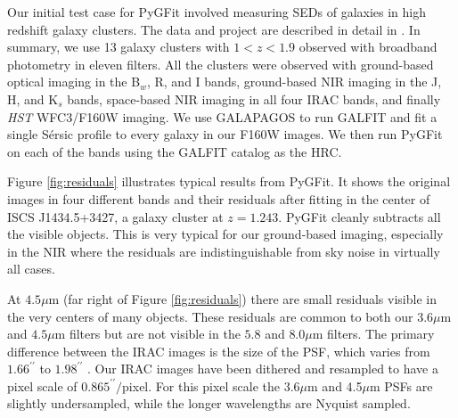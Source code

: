 \documentclass[apj]{emulateapj}
\newcommand{\sersic}{S\'{e}rsic}
\newcommand{\galfit}{GALFIT}
\newcommand{\pygfit}{PyGFit}
\newcommand{\galapagos}{GALAPAGOS}
\begin{document}
\begin{figure*}
\caption{Three examples of cases where \pygfit{} can fail.  The top row of panels shows the F160W images used to create the HRC.  The center row of panels shows the LRI with the same field of view, while the bottom row of panels shows the residuals of the LRI after fitting.  The LRI for the left uses ground-based R band imaging, while the example in the center is taken from the $4.5\mu$m imaging and the example on the right is taken from the IRAC $3.6\mu$m imaging.  The left column shows a galaxy with extended features which cannot be described by a \sersic{} profile.  The center column shows a galaxy which is isolated in F160W but which is blended with another source in $4.5\mu$m.  The right column shows a galaxy near the edge of the F160W image which is blended with a bright source which is outside of the F160W image.  Further details are in the text.}\label{fig:problems}
\end{figure*}

Our initial test case for \pygfit{} involved measuring SEDs of galaxies in high redshift galaxy clusters.  The data and project are described in detail in \citet{mancone13}.  In summary, we use 13 galaxy clusters with $1 < z < 1.9$ observed with broadband photometry in eleven filters.  All the clusters were observed with ground-based optical imaging in the B$_w$, R, and I bands, ground-based NIR imaging in the J, H, and K$_s$ bands, space-based NIR imaging in all four IRAC bands, and finally {\itshape HST} WFC3/F160W imaging.  We use \galapagos{} \citep{galapagos} to run \galfit{} and fit a single \sersic{} profile to every galaxy in our F160W images.  We then run \pygfit{} on each of the bands using the \galfit{} catalog as the HRC.

Figure \ref{fig:residuals} illustrates typical results from \pygfit{}.  It shows the original images in four different bands and their residuals after fitting in the center of ISCS J1434.5+3427, a galaxy cluster at $z=1.243$.  \pygfit{} cleanly subtracts all the visible objects.  This is very typical for our ground-based imaging, especially in the NIR where the residuals are indistinguishable from sky noise in virtually all cases.

At $4.5\mu$m (far right of Figure \ref{fig:residuals}) there are small residuals visible in the very centers of many objects.  These residuals are common to both our $3.6\mu$m and $4.5\mu$m filters but are not visible in the $5.8$ and $8.0\mu$m filters.  The primary difference between the IRAC images is the size of the PSF, which varies from $1.66^{\prime\prime}$ to $1.98^{\prime\prime}$ \citep{irac}. Our IRAC images have been dithered and resampled to have a pixel scale of $0.865^{\prime\prime}/$pixel. For this pixel scale the 3.6$\mu$m and 4.5$\mu$m PSFs are slightly undersampled, while the longer wavelengths are Nyquist sampled.
\end{document}
